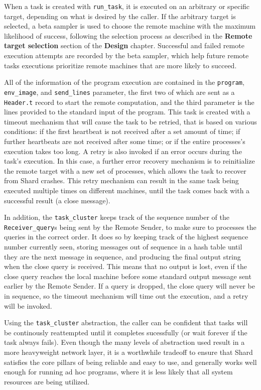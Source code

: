 \documentclass[twoside]{report}
\begin{document}
When a task is created with \texttt{run\_task}, it is executed on an arbitrary or specific target, depending on what is desired by the caller.
If the arbitrary target is selected, a beta sampler is used to choose the remote machine with the maximum likelihood of success, following the selection process as described in the \textbf{Remote target selection} section of the \textbf{Design} chapter.
Successful and failed remote execution attempts are recorded by the beta sampler, which help future remote tasks executions prioritize remote machines that are more likely to succeed.

All of the information of the program execution are contained in the \texttt{program}, \texttt{env\_image}, and \texttt{send\_lines} parameter, the first two of which are sent as a \texttt{Header.t} record to start the remote computation, and the third parameter is the lines provided to the standard input of the program.
This task is created with a timeout mechanism that will cause the task to be retried, that is based on various conditions: if the first heartbeat is not received after a set amount of time; if further heartbeats are not received after some time; or if the entire processes's execution takes too long.
A retry is also invoked if an error occurs during the task's execution.
In this case, a further error recovery mechanism is to reinitialize the remote target with a new set of processes, which allows the task to recover from Shard crashes.
This retry mechanism can result in the same task being executed multiple times on different machines, until the task comes back with a successful result (a close message).

In addition, the \texttt{task\_cluster} keeps track of the sequence number of the \texttt{Receiver\_query}s being sent by the Remote Sender, to make sure to processes the queries in the correct order.
It does so by keeping track of the highest sequence number currently seen, storing messages out of sequence in a hash table until they are the next message in sequence, and producing the final output string when the close query is received.
This means that no output is lost, even if the close query reaches the local machine before some standard output message sent earlier by the Remote Sender.
If a query is dropped, the close query will never be in sequence, so the timeout mechanism will time out the execution, and a retry will be invoked.

Using the \texttt{task\_cluster} abstraction, the caller can be confident that tasks will be continously reattempted until it completes sucessfully (or wait forever if the task always fails).
Even though the many levels of abstraction used result in a more heavyweight network layer, it is a worthwhile tradeoff to ensure that Shard satisfies the core pillars of being reliable and easy to use, and generally works well enough for running ad hoc programs, where it is less likely that all system resources are being utilized.
\end{document}
